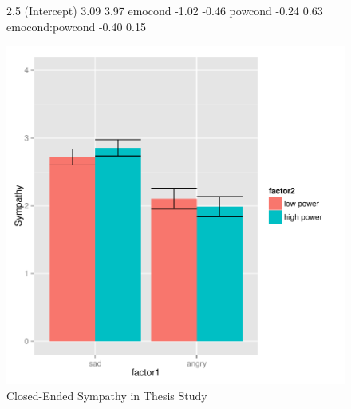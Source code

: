 \documentclass[man,apacite,floatsintext]{apa6}
\begin{document}
\begin{figure}
\begin{Schunk}
\begin{Soutput}
                2.5 %
(Intercept)      3.09   3.97
emocond         -1.02  -0.46
powcond         -0.24   0.63
emocond:powcond -0.40   0.15
\end{Soutput}
\end{Schunk}
\includegraphics{PowerResults-ThesisCloseSymp}
\caption{Closed-Ended Sympathy in Thesis Study}
\end{figure}
\end{document}
